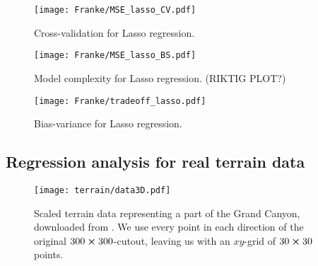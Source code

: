         \begin{figure}
            \texttt{[image: Franke/MSE\_lasso\_CV.pdf]}
            \caption{Cross-validation for Lasso regression.}
            \label{fig:cross-validation_lasso}
        \end{figure}

        \begin{figure}
            \texttt{[image: Franke/MSE\_lasso\_BS.pdf]}
            \caption{Model complexity for Lasso regression. (RIKTIG PLOT?)}
            \label{fig:bootstrapping_lasso}
        \end{figure}

        \begin{figure}
            \texttt{[image: Franke/tradeoff\_lasso.pdf]}
            \caption{Bias-variance for Lasso regression.}
            \label{fig:bias_variance_lasso}
        \end{figure}



    \subsection{Regression analysis for real terrain data}\label{sec:reganalysis_real_data}

    \begin{figure}
        \texttt{[image: terrain/data3D.pdf]}
        \caption{Scaled terrain data representing a part of the Grand Canyon, downloaded from \citep{EarthExplorer}. We use every  point in each direction of the original $300\cross 300$-cutout, leaving us with an $xy$-grid of $30\cross 30$ points.}
        \label{fig:gc_data}
    \end{figure}

    